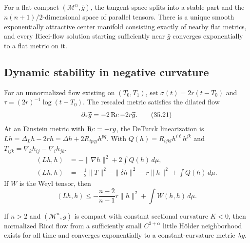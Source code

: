 \begin{theorem}[Asymptotic stability at $\Rm=0$ (Theorem 35.30)]
\label{thm:chow-iv-flat-asymptotic-stability}


For a flat compact $(\mathcal M^n,\bar g)$, the tangent space splits into a
stable part and the $n(n+1)/2$-dimensional space of parallel tensors.  There
is a unique smooth exponentially attractive center manifold consisting exactly
of nearby flat metrics, and every Ricci-flow solution starting sufficiently
near $\bar g$ converges exponentially to a flat metric on it.
\end{theorem}

\subsection{Dynamic stability in negative curvature}

For an unnormalized flow existing on $(T_0,T_1)$, set
$\sigma(t)=2r(t-T_0)$ and $\tau=(2r)^{-1}\log(t-T_0)$.  The rescaled metric
satisfies the dilated flow
\begin{equation*}
 \partial_\tau\widetilde g=-2\operatorname{Rc}-2r\widetilde g.
 \tag{35.21}
\end{equation*}
At an Einstein metric with $\operatorname{Rc}=-rg$, the DeTurck linearization is
$Lh=\Delta_Lh-2rh=\Delta h+2R_{ipqj}h^{pq}$.  With
$Q(h)=R_{ijkl}h^{i\ell}h^{jk}$ and
$T_{ijk}=\nabla_kh_{ij}-\nabla_ih_{jk}$,
\begin{align*}
 (Lh,h)&=-\|\nabla h\|^2+2\int Q(h)\,d\mu, \tag{35.22}\\
 (Lh,h)&=-\tfrac12\|T\|^2-\|\delta h\|^2-r\|h\|^2+\int Q(h)\,d\mu. \tag{35.23}
\end{align*}
If $W$ is the Weyl tensor, then
\begin{equation*}
 (Lh,h)\le -\frac{n-2}{n-1}r\|h\|^2+\int W(h,h)\,d\mu.
 \tag{35.24}
\end{equation*}

\begin{theorem}
\label{thm:chow-iv-negative-curvature-stability}


If $n>2$ and $(\mathcal M^n,\bar g)$ is compact with constant sectional
curvature $K<0$, then normalized Ricci flow from a sufficiently small
$C^{2+\alpha}$ little H\"older neighborhood exists for all time and converges
exponentially to a constant-curvature metric $\lambda\bar g$.
\end{theorem}

